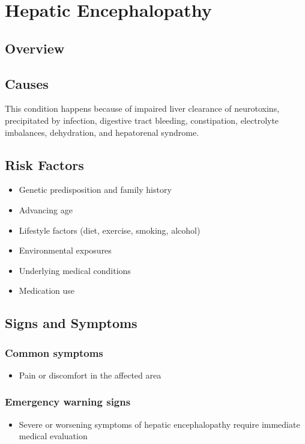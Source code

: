 \chapter{Hepatic Encephalopathy}
\label{sec:Hepatic Encephalopathy}

\section{Overview}

\section{Causes}
This condition happens because of impaired liver clearance of neurotoxins, precipitated by infection, digestive tract bleeding, constipation, electrolyte imbalances, dehydration, and hepatorenal syndrome.     
\section{Risk Factors}

\begin{itemize}[noitemsep]
  \item Genetic predisposition and family history
  \item Advancing age
  \item Lifestyle factors (diet, exercise, smoking, alcohol)
  \item Environmental exposures
  \item Underlying medical conditions
  \item Medication use
\end{itemize}
\section{Signs and Symptoms}

\subsection{Common symptoms}
\begin{itemize}[noitemsep]
  \item Pain or discomfort in the affected area
  \end{itemize}

\subsection{Emergency warning signs}
\begin{itemize}[noitemsep]
  \item Severe or worsening symptoms of hepatic encephalopathy require immediate medical evaluation
\end{itemize}
